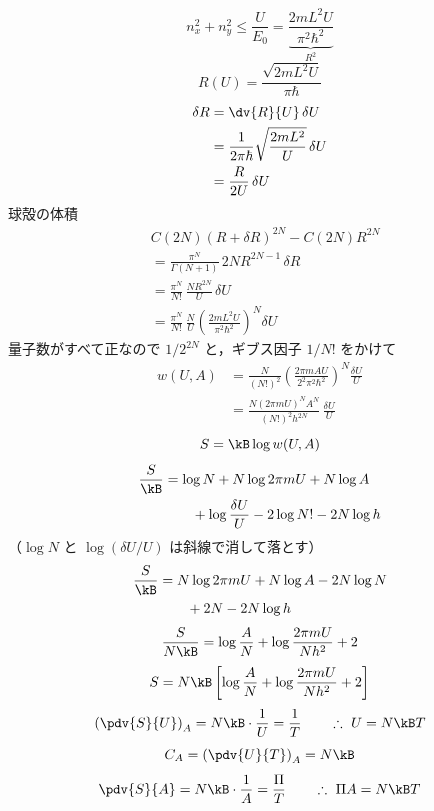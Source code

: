 \[ n_{x}^{2}+n_{y}^{2}\le\frac{U}{E_{0}}=\underbrace{\frac{2mL^{2}U}{\pi^{2}\hbar^{2}}}_{R^{2}} \]
\[ R(U)=\frac{\sqrt{2mL^{2}U}}{\pi\hbar} \]
\begin{align*}
\delta R&=\dv{R}{U}\,\delta U\\
&=\frac{1}{2\pi\hbar}\sqrt{\frac{2mL^{2}}{U}}\,\delta U\\
&=\frac{R}{2U}\,\delta U
\end{align*}
球殻の体積
\begin{align*}
&C(2N)(R+\delta R)^{2N}-C(2N)R^{2N}\\
&=\frac{\pi^{N}}{\Gamma(N+1)}\,2NR^{2N-1}\,\delta R\\
&=\frac{\pi^{N}}{N!}\,\frac{NR^{2N}}{U}\,\delta U\\
&=\frac{\pi^{N}}{N!}\,\frac{N}{U}\left(\frac{2mL^{2}U}{\pi^{2}\hbar^{2}}\right)^{N}\delta U
\end{align*}
量子数がすべて正なので $1/2^{2N}$ と，ギブス因子 $1/N!$ をかけて
\begin{align*}
w(U,A)&=\frac{N}{(N!)^{2}}\left(\frac{2\pi mAU}{2^{2}\pi^{2}\hbar^{2}}\right)^{N}\frac{\delta U}{U}\\
&=\frac{N(2\pi mU)^{N}A^{N}}{(N!)^{2}h^{2N}}\,\frac{\delta U}{U}
\end{align*}
\[ S=\kB\log w(U,A) \]
\begin{align*}
\frac{S}{\kB}&=\log N+N\log2\pi mU+N\log A\\
&\qquad+\log\frac{\delta U}{U}-2\log N!-2N\log h
\end{align*}
（$\log N$ と $\log(\delta U/U)$ は斜線で消して落とす）
\begin{align*}
\frac{S}{\kB}&=N\log2\pi mU+N\log A-2N\log N\\
&\qquad+2N-2N\log h
\end{align*}
\[ \frac{S}{N\kB}=\log\frac{A}{N}+\log\frac{2\pi mU}{Nh^{2}}+2 \]
\[ S=N\kB\left[\log\frac{A}{N}+\log\frac{2\pi mU}{Nh^{2}}+2\right] \]
\[ \left(\pdv{S}{U}\right)_{A}=N\kB\cdot\frac{1}{U}=\frac{1}{T}\qquad\therefore\ U=N\kB T \]
\[ C_{A}=\left(\pdv{U}{T}\right)_{A}=N\kB \]
\[ \pdv{S}{A}=N\kB\cdot\frac{1}{A}=\frac{\Pi}{T}\qquad\therefore\ \Pi A=N\kB T \]
